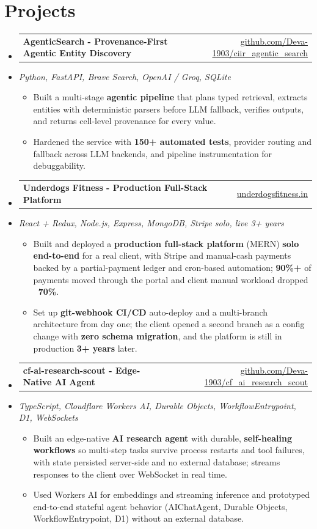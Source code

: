 \documentclass[letterpaper,10pt]{article}
\makeatletter
\newcommand{\resumeItem}[1]{
  \item\small{#1\vspace{-1pt}}
}
\newcommand{\resumeProjectHeading}[2]{
    \item
    \begin{tabular*}{0.985\textwidth}[t]{l@{\extracolsep{\fill}}r}
      \small\textbf{#1} & \small #2 \\
    \end{tabular*}\vspace{-5pt}
}
\newcommand{\resumeProjectSubheading}[1]{
  \vspace{-2pt}\item[] {\small\textcolor{ResumeSlate}{\emph{#1}}}\vspace{-3pt}
}
\newcommand{\resumeSubHeadingListStart}{\begin{itemize}[leftmargin=0.0in, label={}, itemsep=2pt, topsep=2pt]}
\newcommand{\resumeSubHeadingListEnd}{\end{itemize}}
\newcommand{\resumeItemListStart}{\begin{itemize}[leftmargin=0.18in, itemsep=2pt, topsep=1pt]}
\newcommand{\resumeItemListEnd}{\end{itemize}\vspace{-4pt}}
\makeatother
\begin{document}
\section{Projects}
\resumeSubHeadingListStart
  \resumeProjectHeading
    {AgenticSearch - Provenance-First Agentic Entity Discovery}
    {\href{https://github.com/Deva-1903/ciir_agentic_search}{github.com/Deva-1903/ciir\_agentic\_search}}
  \resumeProjectSubheading{Python, FastAPI, Brave Search, OpenAI / Groq, SQLite}
    \resumeItemListStart
      \resumeItem{Built a multi-stage \textbf{agentic pipeline} that plans typed retrieval, extracts entities with deterministic parsers before LLM fallback, verifies outputs, and returns cell-level provenance for every value.}
      \resumeItem{Hardened the service with \textbf{150+ automated tests}, provider routing and fallback across LLM backends, and pipeline instrumentation for debuggability.}
    \resumeItemListEnd
  \resumeProjectHeading
    {Underdogs Fitness - Production Full-Stack Platform}
    {\href{https://www.underdogsfitness.in}{underdogsfitness.in}}
  \resumeProjectSubheading{React + Redux, Node.js, Express, MongoDB, Stripe \enspace\textbar\enspace solo, live 3+ years}
    \resumeItemListStart
      \resumeItem{Built and deployed a \textbf{production full-stack platform} (MERN) \textbf{solo end-to-end} for a real client, with Stripe and manual-cash payments backed by a partial-payment ledger and cron-based automation; \textbf{90\%+} of payments moved through the portal and client manual workload dropped \textbf{~70\%}.}
      \resumeItem{Set up \textbf{git-webhook CI/CD} auto-deploy and a multi-branch architecture from day one; the client opened a second branch as a config change with \textbf{zero schema migration}, and the platform is still in production \textbf{3+ years} later.}
    \resumeItemListEnd
  \resumeProjectHeading
    {cf-ai-research-scout - Edge-Native AI Agent}
    {\href{https://github.com/Deva-1903/cf_ai_research_scout}{github.com/Deva-1903/cf\_ai\_research\_scout}}
  \resumeProjectSubheading{TypeScript, Cloudflare Workers AI, Durable Objects, WorkflowEntrypoint, D1, WebSockets}
    \resumeItemListStart
      \resumeItem{Built an edge-native \textbf{AI research agent} with durable, \textbf{self-healing workflows} so multi-step tasks survive process restarts and tool failures, with state persisted server-side and no external database; streams responses to the client over WebSocket in real time.}
      \resumeItem{Used Workers AI for embeddings and streaming inference and prototyped end-to-end stateful agent behavior (AIChatAgent, Durable Objects, WorkflowEntrypoint, D1) without an external database.}
    \resumeItemListEnd
\resumeSubHeadingListEnd
\vspace{-4pt}
\end{document}
